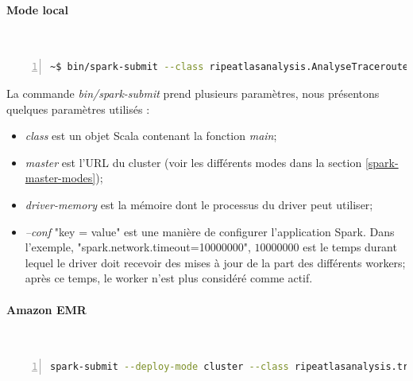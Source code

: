 \paragraph{Mode local}~

\begin{lstlisting}[language=bash,firstnumber=1, caption={Exemple de la soumissions d'un traitement sur Spark},label={lst:submit}, basicstyle = \small,escapechar=|,numbers=left,
stepnumber=1]
~$ bin/spark-submit --class ripeatlasanalysis.AnalyseTraceroute     --master local --driver-memory 30G  --conf "spark.network.timeout=10000000" DelayAnalysis-0.0.5-SNAPSHOT-jar-with-dependencies.jar  1517961600  1518134400 3600 
\end{lstlisting}
La commande \textit{bin/spark-submit} prend plusieurs paramètres, nous présentons quelques paramètres utilisés :
\begin{itemize}
	\item \textit{class} est un objet Scala contenant la fonction \textit{main};
	\item  \textit{master} est l'URL du cluster (voir les différents modes dans la section \ref{spark-master-modes});
	\item \textit{driver-memory} est la mémoire dont le processus du driver peut utiliser;
	
	\item  \textit{--conf} "key = value" est une manière de configurer l'application Spark. Dans l'exemple, "spark.network.timeout=10000000", $ 10000000 $ est le temps durant lequel le driver doit recevoir  des mises à jour de la part des différents workers; après ce temps, le worker n'est plus considéré comme actif.
\end{itemize}

\paragraph{Amazon EMR }~

\begin{lstlisting}[language=bash,firstnumber=1, caption={Exemple de la soumissions d'un traitement sur Spark},label={lst:submit}, basicstyle = \small,escapechar=|,numbers=left,
stepnumber=1]
spark-submit --deploy-mode cluster --class ripeatlasanalysis.traceroutesAnalysis s3://amazon-emr-bucket/DelayAnalysis-AWS-EMR-Final-0.0.2-SNAPSHOT-jar-with-dependencies.jar 1517961600 1518048000 3600 s3://ripeatlasdata/traceroute/source=api/af_=4/type_=builtin/msm=5004/year=2018/month=2/day=07 s3://amazon-emr-bucket/resultats
\end{lstlisting}
